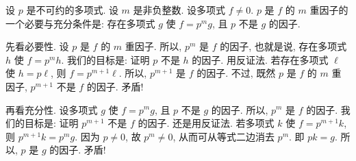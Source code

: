 \begin{proposition}
    设 $p$ 是不可约的多项式. 设 $m$ 是非负整数. 设多项式 $f \neq 0$. $p$ 是 $f$ 的 $m$ 重因子的一个必要与充分条件是: 存在多项式 $g$ 使 $f = p^m g$, 且 $p$ 不是 $g$ 的因子.
\end{proposition}

\begin{pf}
    先看必要性. 设 $p$ 是 $f$ 的 $m$ 重因子. 所以, $p^m$ 是 $f$ 的因子, 也就是说, 存在多项式 $h$ 使 $f = p^m h$. 我们的目标是: 证明 $p$ 不是 $h$ 的因子. 用反证法. 若存在多项式 $\ell$ 使 $h = p\ell$, 则 $f = p^{m+1} \ell$. 所以, $p^{m+1}$ 是 $f$ 的因子. 不过, 既然 $p$ 是 $f$ 的 $m$ 重因子, $p^{m+1}$ 不是 $f$ 的因子. 矛盾!

    再看充分性. 设多项式 $g$ 使 $f = p^m g$, 且 $p$ 不是 $g$ 的因子. 所以, $p^m$ 是 $f$ 的因子. 我们的目标是: 证明 $p^{m+1}$ 不是 $f$ 的因子. 还是用反证法. 若多项式 $k$ 使 $f = p^{m+1} k$, 则 $p^{m+1} k = p^m g$. 因为 $p \neq 0$, 故 $p^m \neq 0$, 从而可从等式二边消去 $p^m$. 即 $pk = g$. 所以, $p$ 是 $g$ 的因子. 矛盾!
\end{pf}


